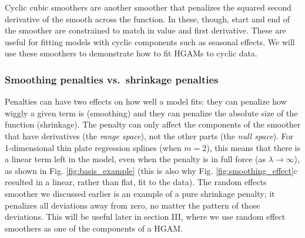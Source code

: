 \documentclass[12pt]{article}
\begin{document}
Cyclic cubic smoothers are another smoother that penalizes the squared
second derivative of the smooth across the function. In these, though,
start and end of the smoother are constrained to match in value and
first derivative. These are useful for fitting models with cyclic
components such as seasonal effects. We will use these smoothers to
demonstrate how to fit HGAMs to cyclic data.

\subsubsection{Smoothing penalties vs.~shrinkage
penalties}\label{smoothing-penalties-vs.shrinkage-penalties}

Penalties can have two effects on how well a model fits: they can
penalize how wiggly a given term is (smoothing) and they can penalize
the absolute size of the function (shrinkage). The penalty can only
affect the components of the smoother that have derivatives (the
\emph{range space}), not the other parts (the \emph{null space}). For
1-dimensional thin plate regression splines (when \(m=2\)), this means
that there is a linear term left in the model, even when the penalty is
in full force (as \(\lambda \rightarrow \infty\)), as shown in Fig.
\ref{fig:basis_example} (this is also why Fig.
\ref{fig:smoothing_effect}c resulted in a linear, rather than flat, fit
to the data). The random effects smoother we discussed earlier is an
example of a pure shrinkage penalty; it penalizes all deviations away
from zero, no matter the pattern of those deviations. This will be
useful later in section III, where we use random effect smoothers as one
of the components of a HGAM.
\end{document}
